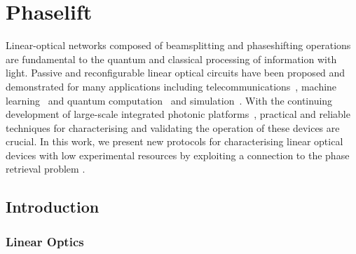 \chapter{Phaselift}
\label{chap:phaselift}


Linear-optical networks composed of beamsplitting and phaseshifting operations are fundamental to the quantum and classical processing of information with light.
Passive and reconfigurable linear optical circuits have been proposed and demonstrated for many applications including telecommunications~\cite{Miller2015}, machine learning~\cite{Shen2017} and quantum computation~\cite{Carolan2015} and simulation~\cite{Harris2017}.
With the continuing development of large-scale integrated photonic platforms~\cite{Silverstone2016,Seok2016}, practical and reliable techniques for characterising and validating the operation of these devices are crucial.
In this work, we present new protocols for characterising linear optical devices with low experimental resources by exploiting a connection to the phase retrieval problem \cite{walther_question_1963}.

\section{Introduction}
\subsection{Linear Optics}

